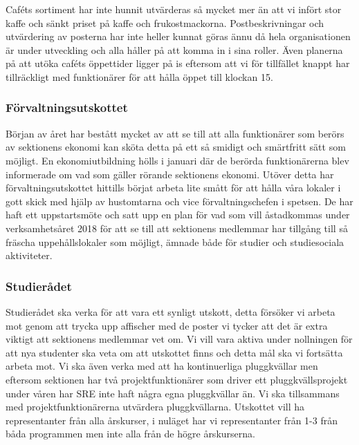 \documentclass[../_main/handlingar.tex]{subfiles}
\begin{document}
Caféts sortiment har inte hunnit utvärderas så mycket mer än att vi infört stor kaffe och sänkt priset på kaffe och frukostmackorna. Postbeskrivningar och utvärdering av posterna har inte heller kunnat göras ännu då hela organisationen är under utveckling och alla håller på att komma in i sina roller. Även planerna på att utöka caféts öppettider ligger på is eftersom att vi för tillfället knappt har tillräckligt med funktionärer för att hålla öppet till klockan 15. 

\subsubsection*{Förvaltningsutskottet}
Början av året har bestått mycket av att se till att alla funktionärer som berörs av sektionens ekonomi kan sköta detta på ett så smidigt och smärtfritt sätt som möjligt.  
En ekonomiutbildning hölls i januari där de berörda funktionärerna blev informerade om vad som gäller rörande sektionens ekonomi.
Utöver detta har förvaltningsutskottet hittills börjat arbeta lite smått för att hålla våra lokaler i gott skick med hjälp av hustomtarna och vice förvaltningschefen i spetsen. De har haft ett uppstartsmöte och satt upp en plan för vad som vill åstadkommas under verksamhetsåret 2018 för att se till att sektionens medlemmar har tillgång till så fräscha uppehållslokaler som möjligt, ämnade både för studier och studiesociala aktiviteter.

\subsubsection*{Studierådet}
Studierådet ska verka för att vara ett synligt utskott, detta försöker vi arbeta mot genom att trycka upp affischer med de poster vi tycker att det är extra viktigt att sektionens medlemmar vet om. Vi vill vara aktiva under nollningen för att nya studenter ska veta om att utskottet finns och detta mål ska vi fortsätta arbeta mot. Vi ska även verka med att ha kontinuerliga pluggkvällar men eftersom sektionen har två projektfunktionärer som driver ett pluggkvällsprojekt under våren har SRE inte haft några egna pluggkvällar än. Vi ska tillsammans med projektfunktionärerna utvärdera pluggkvällarna. Utskottet vill ha representanter från alla årskurser, i nuläget har vi representanter från 1-3 från båda programmen men inte alla från de högre årskurserna.  
\end{document}
